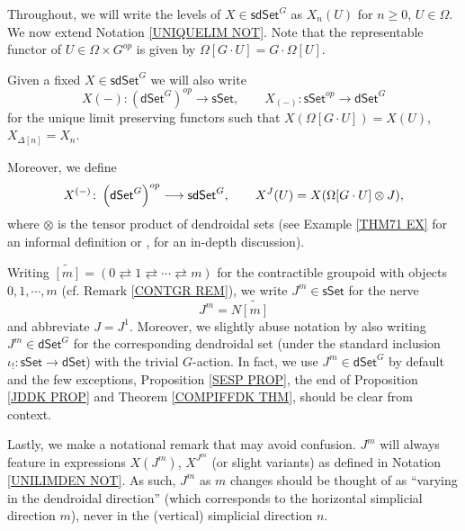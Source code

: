 \documentclass[a4paper,10pt
,draft
]{article}%
\begin{document}
Throughout, we will write the levels of 
$X \in \mathsf{sdSet}^G$ as 
$X_n(U)$ for $n\geq 0$, $U \in \Omega$.
We now extend Notation \ref{UNIQUELIM NOT}.
Note that the representable functor of
$U \in \Omega \times G^{op}$ is given by $\Omega[G \cdot U] = G \cdot \Omega[U]$.

\begin{notation}\label{UNILIMDEN NOT}
	Given a fixed $X \in \mathsf{sdSet}^G$ we will also write
\[
	X(-)\colon \left(\mathsf{dSet}^G \right)^{op} \to \mathsf{sSet},\qquad 
	X_{(-)} \colon \mathsf{sSet}^{op} \to \mathsf{dSet}^{G}
\]
	for the unique limit preserving functors such that
	$X(\Omega[G \cdot U]) = X(U)$, $X_{\Delta[n]} = X_n$.
	
        Moreover,
        we define
        \[
              X^{(-)}\colon \left(\mathsf{dSet}^G \right)^{op} \longrightarrow \mathsf{sdSet}^G,
              \qquad
              X^J(U) = X(\Omega[G \cdot U] \otimes J),
        \]
	where $\otimes$ is the tensor product of dendroidal sets (see Example \ref{THM71 EX} for an informal definition or \cite[\S 9]{MW09},\cite[\S 7]{Per18} for an in-depth discussion).
\end{notation}



\begin{notation}\label{JM NOT}
Writing
	$\widetilde{[m]} = 
	(0 \rightleftarrows 
	1 \rightleftarrows \cdots
	\rightleftarrows m)$
for the contractible groupoid with objects 
$0,1,\cdots,m$ (cf. Remark \ref{CONTGR REM}),
we write $J^m \in \mathsf{sSet}$ for the nerve
\[
J^m = N \widetilde{[m]}
\]
and abbreviate $J = J^1$.
Moreover, we slightly abuse notation by also writing $J^m \in \mathsf{dSet}^G$ for the corresponding dendroidal set 
(under the standard inclusion $\iota_! \colon \mathsf{sSet} \to \mathsf{dSet}$) with the trivial $G$-action.
In fact, we use $J^m \in \mathsf{dSet}^G$ by default and the few  exceptions,
Proposition \ref{SESP PROP},
the end of
Proposition \ref{JDDK PROP}
and
Theorem \ref{COMPIFFDK THM},
should be clear from context.

Lastly, we make a notational remark that may avoid confusion. $J^m$ will always feature in expressions $X(J^m)$, $X^{J^m}$ (or slight variants) as defined in Notation \ref{UNILIMDEN NOT}. As such, $J^{m}$ as $m$ changes should be thought of as ``varying in the dendroidal direction'' (which corresponds to the horizontal simplicial direction $m$), never in the (vertical) simplicial direction $n$.
\end{notation}
\end{document}

